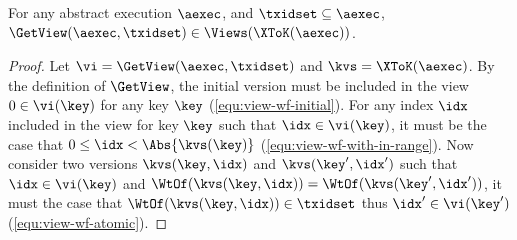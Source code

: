 \begin{toappendix}
\label{sec:proof-well-formed-get-view}
\begin{proposition}
\label{prop:getview-valid}
For any abstract execution \(\aexec\), and \(\txidset \subseteq \aexec\), 
\(\GetView(\aexec, \txidset) \in \Views(\XToK(\aexec))\).
\end{proposition}
\begin{proof}
Let \( \vi = \GetView(\aexec, \txidset)\) and \( \kvs = \XToK(\aexec) \).
By the definition of \(\GetView\),
the initial version must be included in the view \(0 \in \vi(\key)\) for any key \( \key \) (\cref{equ:view-wf-initial}).
For any index \( \idx \) included in the view for key \( \key \) such that \( \idx \in \vi(\key) \), 
it must be the case that \(0 \leq \idx < \Abs{ \kvs(\key) }\) (\cref{equ:view-wf-with-in-range}).
Now consider two versions \( \kvs(\key,\idx) \) and \( \kvs(\key',\idx') \) such that
\( \idx \in \vi(\key)\) and \( \WtOf(\kvs(\key,\idx)) = \WtOf(\kvs(\key',\idx')) \),
it must the case that \( \WtOf(\kvs(\key,\idx)) \in \txidset \) thus \( \idx' \in \vi(\key')\) (\cref{equ:view-wf-atomic}).
\end{proof}
\end{toappendix}



